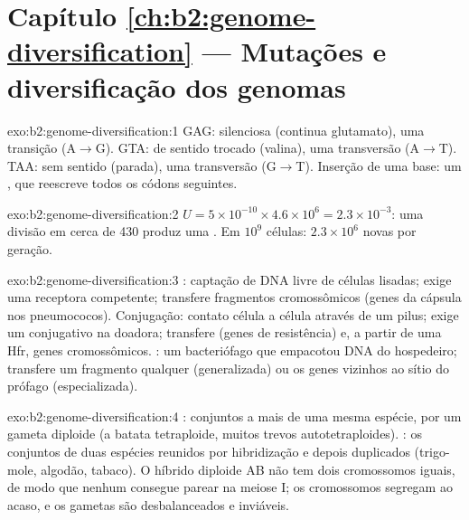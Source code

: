 \section*{Capítulo \ref{ch:b2:genome-diversification} --- Mutações e diversificação dos genomas}

\begin{solution}{exo:b2:genome-diversification:1}
GAG: silenciosa (continua glutamato), uma transição (A$\to$G). GTA: de
sentido trocado (valina), uma transversão (A$\to$T). TAA: sem sentido
(parada), uma transversão (G$\to$T). Inserção de uma base: um
, que reescreve todos os códons
seguintes.
\end{solution}

\begin{solution}{exo:b2:genome-diversification:2}
$U = 5\times 10^{-10}\times 4.6\times 10^{6} = 2.3\times 10^{-3}$: uma
divisão em cerca de 430 produz uma . Em $10^{9}$ células:
$2.3\times 10^{6}$  novas por geração.
\end{solution}

\begin{solution}{exo:b2:genome-diversification:3}
: captação de DNA livre de células lisadas; exige uma
receptora competente; transfere fragmentos cromossômicos (genes da
cápsula nos pneumococos). Conjugação: contato célula a célula através
de um pilus; exige um  conjugativo na doadora; transfere
 (genes de resistência) e, a partir de uma Hfr, genes
cromossômicos. : um bacteriófago que empacotou DNA do
hospedeiro; transfere um fragmento qualquer (generalizada) ou os genes
vizinhos ao sítio do prófago (especializada).
\end{solution}

\begin{solution}{exo:b2:genome-diversification:4}
: conjuntos a mais de uma mesma espécie, por um gameta
diploide (a batata tetraploide, muitos trevos autotetraploides).
: os conjuntos de duas espécies reunidos por hibridização
e depois duplicados (trigo-mole, algodão, tabaco). O híbrido diploide
AB não tem dois cromossomos iguais, de modo que nenhum consegue parear
na meiose I; os cromossomos segregam ao acaso, e os gametas são
desbalanceados e inviáveis.
\end{solution}


